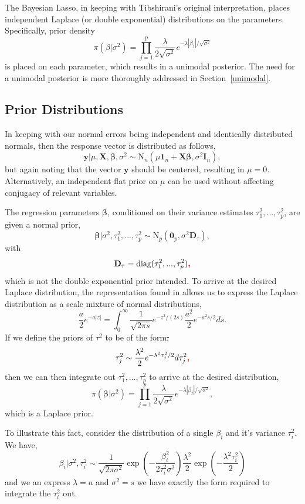 \documentclass{uwstat572}
\newcommand{\vmdel}[1]{\sout{#1}}
\newcommand{\vmadd}[1]{\textbf{\color{red}{#1}}}
\begin{document}
The Bayesian Lasso, in keeping with Tibshirani's original interpretation, places independent Laplace (or double exponential) distributions on the parameters. Specifically, prior density \[
\pi(\beta|\sigma^2)=\prod_{j=1}^p\frac{\lambda}{2\sqrt{\sigma^2}}e^{-\lambda |\beta_j|/\sqrt{\sigma^2}}
\] is placed on each parameter, which results in a unimodal posterior. The need for a unimodal posterior is more thoroughly addressed in Section~\ref{unimodal}.

\subsection{Prior Distributions}
In keeping with our normal errors being independent and identically distributed normals, then the response vector is distributed as follows, \[
\mathbf{y}|\mu,\mathbf{X},\boldsymbol\beta,\sigma^2 \sim \text{N}_n(\mu \mathbf{1}_n+\mathbf{X}\boldsymbol\beta,\sigma^2\mathbf{I}_n), \] but again noting that the vector $\mathbf{y}$ should be centered, resulting in $\mu=0$. Alternatively, an independent flat prior on $\mu$ can be used without affecting conjugacy of relevant variables.

The regression parameters $\boldsymbol\beta$, conditioned on their variance estimates $\tau_1^2,...,\tau_p^2$, are given a normal prior, \[ 
\boldsymbol\beta|\sigma^2,\tau^2_1,...,\tau^2_p\sim\text{N}_p(\mathbf{0}_p,\sigma^2\mathbf{D}_\tau),\] with \[ \mathbf{D}_\tau=\text{diag}(\tau_1^2,...,\tau^2_p)\vmadd{,} \] 
which is not the double exponential prior intended. To arrive at the desired Laplace distribution, the representation found in \citep{andrews1974scale} allows us to express the Laplace distribution as a scale mixture of normal distributions, \[ \frac{a}{2}e^{-a|z|}=\int^\infty_0
\frac{1}{\sqrt{2\pi s}}e^{-z^2/(2s)}\frac{a^2}{2}e^{-a^2s/2}ds.\] If we define the priors of $\tau^2$ to be of the form\vmdel{,} \[ \tau^2_j \sim \frac{\lambda^2}{2}e^{-\lambda^2\tau^2_j/2}d\tau^2_j\vmadd{,}\] then we can then integrate out $\tau^2_1,...,\tau^2_p$ to arrive at the desired distribution, \[ \pi(\boldsymbol\beta|\sigma^2)=\prod^p_{j=1}\frac{\lambda}{2\sqrt{\sigma^2}}e^{-\lambda|\beta_j|/\sqrt{\sigma^2}}, \] which is a Laplace prior. 

To illustrate this fact, consider the distribution of a single $\beta_i$ and it's variance $\tau_i^2$. We have, \[
\beta_i|\sigma^2,\tau_i^2 \sim \frac{1}{\sqrt{2\pi\sigma^2}}\exp{\left( -\frac{\beta_i^2}{2\tau_i^2\sigma^2}\right)}\frac{\lambda^2}{2}\exp{\left( -\frac{\lambda^2\tau_i^2}{2}\right)} 
\] and we an express $\lambda=a$ and $\sigma^2=s$ we have exactly the form required to integrate the $\tau^2_i$ out.
\end{document}
